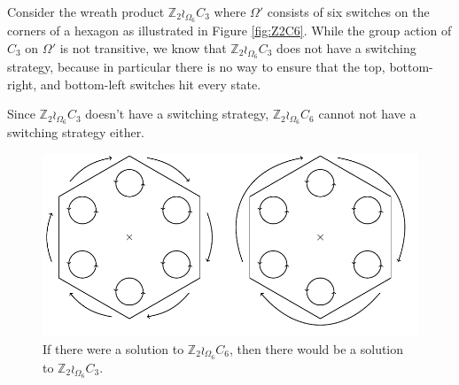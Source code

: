 \begin{example}
  Consider the wreath product $\mathbb Z_2 \wr_{\Omega_6} C_3$ where
  $\Omega'$ consists of six switches on the corners of a hexagon as
  illustrated in Figure \ref{fig:Z2C6}. While the group action of $C_3$ on
  $\Omega'$ is not transitive, we know that $\mathbb Z_2 \wr_{\Omega_6} C_3$ does
  not have a switching strategy, because in particular there is no way to
  ensure that the  top, bottom-right, and bottom-left switches hit every state.

  Since $\mathbb Z_2 \wr_{\Omega_6} C_3$ doesn't have a switching strategy,
  $\mathbb Z_2 \wr_{\Omega_6} C_6$ cannot not have a switching strategy either.
  \begin{figure}
    \center
    \includegraphics{assets/tikz_Z2C6.pdf}
    \caption{If there were a solution to $\mathbb Z_2 \wr_{\Omega_6} C_6$,
    then there would be a solution to $\mathbb Z_2 \wr_{\Omega_6} C_3$.}
  \end{figure}
  \label{fig:Z2C6}
\end{example}

